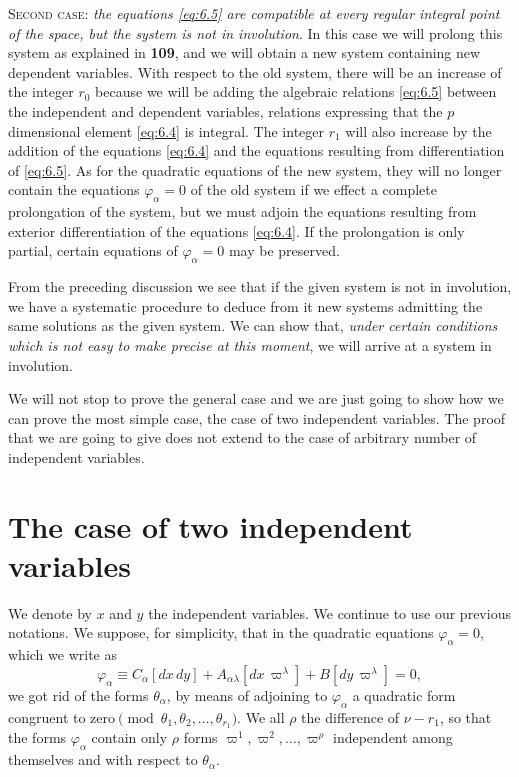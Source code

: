 \vspace{12pt}\textsc{Second case}: \emph{the equations \eqref{eq:6.5} are compatible at every regular integral point of the space, but the system is not in involution}. In this case we will prolong this system as explained in \textsection\textbf{109}, and we will obtain a new system containing new dependent variables. With respect to the old system, there will be an increase of the integer $r_{0}$ because we will be adding  the algebraic relations \eqref{eq:6.5} between the independent and dependent variables, relations expressing that the $p$ dimensional element \eqref{eq:6.4} is integral. The integer $r_{1}$ will also increase by the addition of the equations \eqref{eq:6.4} and the equations resulting from differentiation of \eqref{eq:6.5}. As for the quadratic equations of the new system, they will no longer contain the equations $\varphi_{\alpha}=0$ of the old system if we effect a complete prolongation of the system, but we must adjoin the equations resulting from exterior differentiation of the equations \eqref{eq:6.4}. If the prolongation is only partial, certain equations of $\varphi_{\alpha}=0$ may be preserved.


\vspace{12pt}\fsec From the preceding discussion we see that if the given system is not in involution, we have a systematic procedure to deduce from it new systems admitting the same solutions as the given system. We can show that, \emph{under certain conditions which is not easy to make precise at this moment},  we will arrive at a system in involution.

We will not stop to prove the general case and we are just going to show how we can prove the most simple case, the case of two independent variables. The proof that we are going to give does not extend to the case of arbitrary number of independent variables.


\section{The case of two independent variables}
\label{sec:case-two-independent-1}

\fsec We denote by $x$ and $y$ the independent variables. We continue to use our previous notations. We suppose, for simplicity, that in the quadratic equations $\varphi_{\alpha}=0$, which we write as
\begin{equation}
  \label{eq:6.6}
  \varphi_{\alpha}\equiv C_{\alpha}[dx\,dy]+A_{\alpha\lambda}[dx\,\varpi^{\lambda}]+B[dy\,\varpi^{\lambda}]=0,
\end{equation}
we got rid of the forms $\theta_{\alpha}$, by means of adjoining to $\varphi_{\alpha}$ a quadratic form congruent to zero$\pmod{\theta_{1},\theta_{2},\dots,\theta_{r_{1}}}$. We all $\rho$ the difference of $\nu-r_{1}$,  so that the forms $\varphi_{\alpha}$ contain only $\rho$ forms $\varpi^{1},\varpi^{2},\dots,\varpi^{\rho}$ independent among themselves and with respect to $\theta_{\alpha}$.

